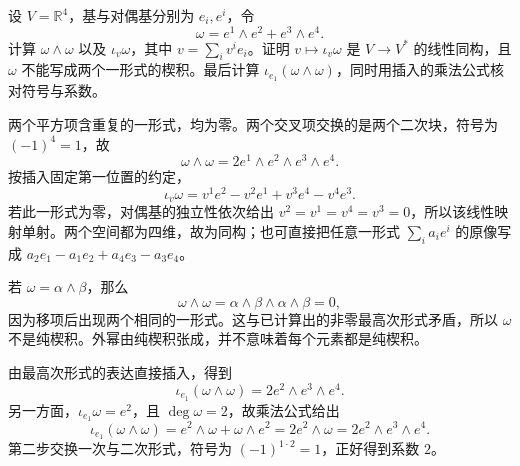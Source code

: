 \begin{exercise}
	\label{g1:exr:1202-wedge-insertion}
	设 \(V=\mathbb R^4\)，基与对偶基分别为 \(e_i,e^i\)，令
	\[
		\omega=e^1\wedge e^2+e^3\wedge e^4.
	\]
	计算 \(\omega\wedge\omega\) 以及 \(\iota_v\omega\)，其中 \(v=\sum_iv^ie_i\)。证明 \(v\mapsto\iota_v\omega\) 是 \(V\to V^*\) 的线性同构，且 \(\omega\) 不能写成两个一形式的楔积。最后计算 \(\iota_{e_1}(\omega\wedge\omega)\)，同时用插入的乘法公式核对符号与系数。
\end{exercise}
\begin{solution}
	两个平方项含重复的一形式，均为零。两个交叉项交换的是两个二次块，符号为 \((-1)^4=1\)，故
	\[
		\omega\wedge\omega=2e^1\wedge e^2\wedge e^3\wedge e^4.
	\]
	按插入固定第一位置的约定，
	\[
		\iota_v\omega=v^1e^2-v^2e^1+v^3e^4-v^4e^3.
	\]
	若此一形式为零，对偶基的独立性依次给出 \(v^2=v^1=v^4=v^3=0\)，所以该线性映射单射。两个空间都为四维，故为同构；也可直接把任意一形式 \(\sum_i a_ie^i\) 的原像写成 \(a_2e_1-a_1e_2+a_4e_3-a_3e_4\)。

	若 \(\omega=\alpha\wedge\beta\)，那么
	\[
		\omega\wedge\omega=\alpha\wedge\beta\wedge\alpha\wedge\beta=0,
	\]
	因为移项后出现两个相同的一形式。这与已计算出的非零最高次形式矛盾，所以 \(\omega\) 不是纯楔积。外幂由纯楔积张成，并不意味着每个元素都是纯楔积。

	由最高次形式的表达直接插入，得到
	\[
		\iota_{e_1}(\omega\wedge\omega)=2e^2\wedge e^3\wedge e^4.
	\]
	另一方面，\(\iota_{e_1}\omega=e^2\)，且 \(\deg\omega=2\)，故乘法公式给出
	\[
		\iota_{e_1}(\omega\wedge\omega)
		=e^2\wedge\omega+\omega\wedge e^2
		=2e^2\wedge\omega
		=2e^2\wedge e^3\wedge e^4.
	\]
	第二步交换一次与二次形式，符号为 \((-1)^{1\cdot2}=1\)，正好得到系数 \(2\)。
\end{solution}


